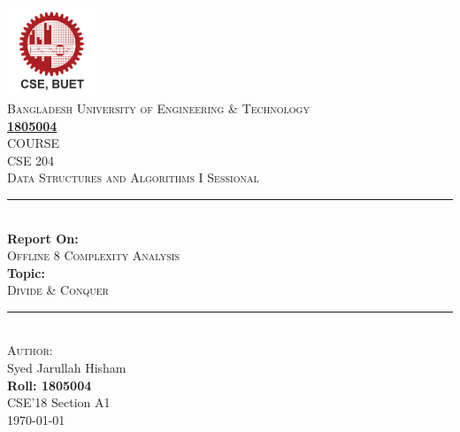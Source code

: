 \documentclass[a4paper]{article}
\begin{document}
\begin{titlepage}

\newcommand{\HRule}{\rule{\linewidth}{0.5mm}} 							%
\center 
 
\includegraphics[width=0.2\textwidth]{images/download.png}\\[1cm] 	
\textsc{\LARGE Bangladesh University of Engineering \& Technology}\\[1cm]

\textsc{\underline{\textbf{\Large 1805004}}}\\[1cm]
\textsc{\Large COURSE}\\[0.2cm]
\textsc{\large CSE 204}\\[0.5cm] 		
\textsc{\large Data Structures and Algorithms I Sessional}\\[1.5cm] 	
\HRule \\[0.8cm]
{ \huge \bfseries Report On:}\\[0.7cm]	
\textsc{\large Offline 8 Complexity Analysis}\\[1cm] 
{ \huge \bfseries Topic:}\\[0.7cm]	
\textsc{\large Divide \& Conquer}\\[1cm] 
\HRule \\[1.5cm]
\large
\textsc{\emph\large{Author:}}\\
Syed Jarullah Hisham\\
\textbf{Roll: 1805004}\\
CSE'18 Section A1\\[1.5cm]		

{\large \today}\\[5cm]
\vfill 
\end{titlepage}



\large
\end{document}
